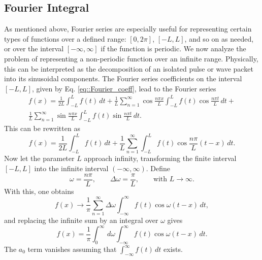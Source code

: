 \documentclass[a4paper]{article}
\begin{document}
\subsection{Fourier Integral}
As mentioned above, Fourier series are especially useful for representing certain types of functions over a defined range: $[0,2\pi]$, $[-L,L]$, and so on as needed, or over the interval $[-\infty,\infty]$ if the function is periodic. We now analyze the problem of representing a non-periodic function over an infinite range. Physically, this can be interpreted as the decomposition of an isolated pulse or wave packet into its sinusoidal components. The Fourier series coefficients on the interval $[-L,L]$, given by Eq. \ref{eq::Fourier_coeff}, lead to the Fourier series
\begin{equation}
\begin{aligned}
f(x)=\frac{1}{2L}\int^L_{-L} f(t)\,dt + \frac{1}{L}\sum_{n=1}^\infty \cos{\frac{n\pi x}{L}}\int^L_{-L} f(t) \cos{\frac{n\pi t}{L}}\, dt +\\
 \frac{1}{L}\sum_{n=1}^{\infty}\sin{\frac{n \pi x}{L}}\int^L_{-L} f(t) \sin\frac{n\pi t}{L}\,dt.
\end{aligned}
\end{equation}
This can be rewritten as
\begin{equation}
f(x)=\frac{1}{2L}\int^L_{-L} f(t)\, dt + \frac{1}{L}\sum^\infty_{n=1}\int^L_{-L} f(t)\cos\frac{n\pi}{L}(t-x)\,dt.
\end{equation}
Now let the parameter $L$ approach infinity, transforming the finite interval $[-L,L]$ into the infinite interval $(-\infty,\infty)$. Define
\begin{equation}
\omega=\frac{n\pi}{L}, \qquad \Delta\omega=\frac{\pi}{L}, \qquad \text{with } L\rightarrow\infty.
\end{equation}
With this, one obtains
\begin{equation}
f(x)\rightarrow \frac{1}{\pi}\sum_{n=1}^\infty \Delta\omega \int_{-\infty}^\infty f(t) \cos{\omega(t-x)}\,dt,
\end{equation}
and replacing the infinite sum by an integral over $\omega$ gives
\begin{equation}\label{eq::Fourier_integral}
f(x)=\frac{1}{\pi}\int_0^\infty\,d\omega \int_{-\infty}^\infty f(t)\cos{\omega(t-x)}\,dt.
\end{equation}
The $a_0$ term vanishes assuming that $\int_{-\infty}^\infty f(t)\,dt$ exists.
\end{document}
